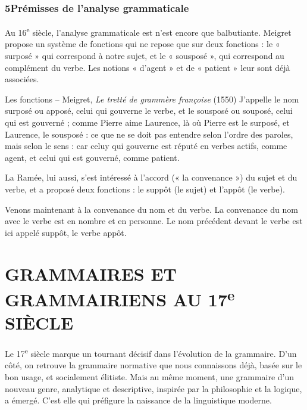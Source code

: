 \subsubsection*{5\quad Prémisses de l’analyse grammaticale}
Au 16\textsuperscript{e} siècle, l’analyse grammaticale est n’est encore que balbutiante. Meigret propose un système de fonctions qui ne repose que sur deux fonctions : le « surposé » qui correspond à notre sujet, et le « sousposé », qui correspond au complément du verbe. Les notions « d’agent » et de « patient » leur sont déjà associées.
\begin{lecture}{Les fonctions – Meigret, \textit{Le tretté de grammère françoise} (1550)}
J’appelle le nom surposé ou apposé, celui qui gouverne le verbe, et le sousposé ou souposé, celui qui est gouverné ; comme Pierre aime Laurence, là où Pierre est le surposé, et Laurence, le sousposé : ce que ne se doit pas entendre selon l’ordre des paroles, mais selon le sens : car celuy qui gouverne est réputé en verbes actifs, comme agent, et celui qui est gouverné, comme patient.
\end{lecture}
La Ramée, lui aussi, s’est intéressé à l’accord (« la convenance ») du sujet et du verbe, et a proposé deux fonctions : le suppôt (le sujet) et l’appôt (le verbe).
\begin{lecture}{}
Venons maintenant à la convenance du nom et du verbe. La convenance du nom avec le verbe est en nombre et en personne. Le nom précédent devant le verbe est ici appelé suppôt, le verbe appôt.
\end{lecture}
\section{GRAMMAIRES ET GRAMMAIRIENS AU 17\textsuperscript{e} SIÈCLE}
Le 17\textsuperscript{e} siècle marque un tournant décisif dans l’évolution de la grammaire. D’un côté, on retrouve la grammaire normative que nous connaissons déjà, basée sur le bon usage, et socialement élitiste. Mais au même moment, une grammaire d’un nouveau genre, analytique et descriptive, inspirée par la philosophie et la logique, a émergé. C’est elle qui préfigure la naissance de la linguistique moderne.
